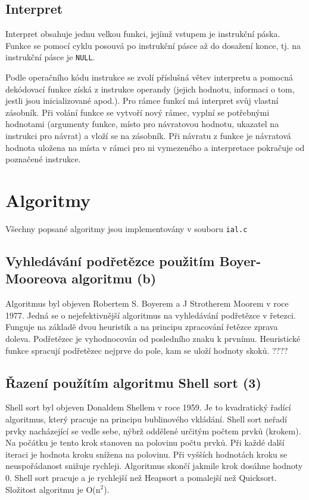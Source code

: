\documentclass[a4paper, 11pt]{article}
\begin{document}
    \subsection{Interpret}
    Interpret obsahuje jednu velkou funkci, jejímž vstupem je instrukční páska. Funkce se pomocí cyklu posouvá po instrukční pásce až do dosažení konce, tj. na instrukční pásce je \texttt{NULL}.\par
    Podle operačního kódu instrukce se zvolí příslušná větev interpretu a pomocná dekódovací funkce získá z instrukce operandy (jejich hodnotu, informaci o tom, jestli jsou inicializované apod.). Pro rámce funkcí má interpret svůj vlastní zásobník. Při volání funkce se vytvoří nový rámec, vyplní se potřebnými hodnotami (argumenty funkce, místo pro návratovou hodnotu, ukazatel na instrukci pro návrat) a vloží se na zásobník. Při návratu z funkce je návratová hodnota uložena na místa v rámci pro ni vymezeného a interpretace pokračuje od poznačené instrukce.
    \section{Algoritmy}
    Všechny popsané algoritmy jsou implementovány v souboru \texttt{ial.c}
    \subsection{Vyhledávání podřetězce použitím Boyer-Mooreova algoritmu (b)}
    Algoritmus byl objeven Robertem S. Boyerem a J Strotherem Moorem v roce 1977. Jedná se o nejefektivnější algoritmus na vyhledávání podřetězce v řetezci. Funguje na základě dvou heuristik a na principu zpracování řetězce zprava doleva. Podřetězec je vyhodnocován od posledního znaku k prvnímu. Heuristické funkce spracují podřetězec nejprve do pole, kam se uloží hodnoty skoků. ????
    \subsection{Řazení použítím algoritmu Shell sort (3)}
    Shell sort byl objeven Donaldem Shellem v roce 1959. Je to kvadratický řadící algoritmus, který pracuje na principu bublinového vkládání.  Shell sort neřadí prvky nacházející se vedle sebe, nýbrž oddělené určitým počtem prvků (krokem). Na počátku je tento krok stanoven na polovinu počtu prvků. Při každé další iteraci je hodnota kroku snížena na polovinu. Při vyšších hodnotách kroku se neuspořádanost snižuje rychleji. Algoritmus skončí jakmile krok dosáhne hodnoty 0. Shell sort pracuje  a je rychlejší než Heapsort a pomalejší než Quicksort. Složitost algoritmu je O(n$^2$).
\end{document}
